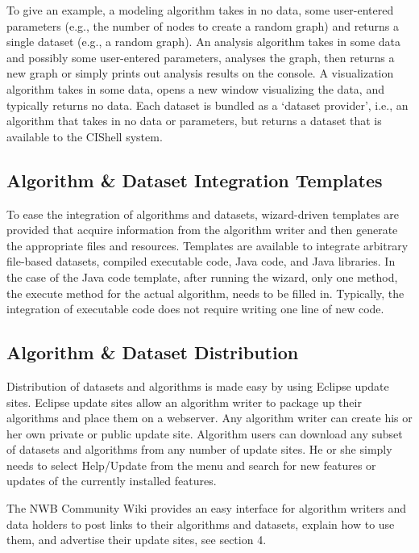 To give an example, a modeling algorithm takes in no data, some user-entered 
parameters (e.g., the number of nodes to create a random graph) and returns a 
single dataset (e.g., a random graph). An analysis algorithm takes in some data 
and possibly some user-entered parameters, analyses the graph, then returns a 
new graph or simply prints out analysis results on the console. A visualization 
algorithm takes in some data, opens a new window visualizing the data, and 
typically returns no data. Each dataset is bundled as a ‘dataset provider’, 
i.e., an algorithm that takes in no data or parameters, but returns a dataset 
that is available to the CIShell system.

\subsection{Algorithm \& Dataset Integration Templates}

To ease the integration of algorithms and datasets, wizard-driven templates are 
provided that acquire information from the algorithm writer and then generate 
the appropriate files and resources. Templates are available to integrate 
arbitrary file-based datasets, compiled executable code, Java code, and Java 
libraries. In the case of the Java code template, after running the wizard, 
only one method, the execute method for the actual algorithm, needs to be 
filled in. Typically, the integration of executable code does not require 
writing one line of new code.

\subsection{Algorithm \& Dataset Distribution}

Distribution of datasets and algorithms is made easy by using Eclipse 
\cite{eclipse} update sites. Eclipse update sites allow an algorithm writer to 
package up their algorithms and place them on a webserver. Any algorithm writer 
can create his or her own private or public update site. Algorithm users can 
download any subset of datasets and algorithms from any number of update sites. 
He or she simply needs to select Help/Update from the menu and search for new 
features or updates of the currently installed features.

The NWB Community Wiki provides an easy interface for algorithm writers and data 
holders to post links to their algorithms and datasets, explain how to use 
them, and advertise their update sites, see section 4.

